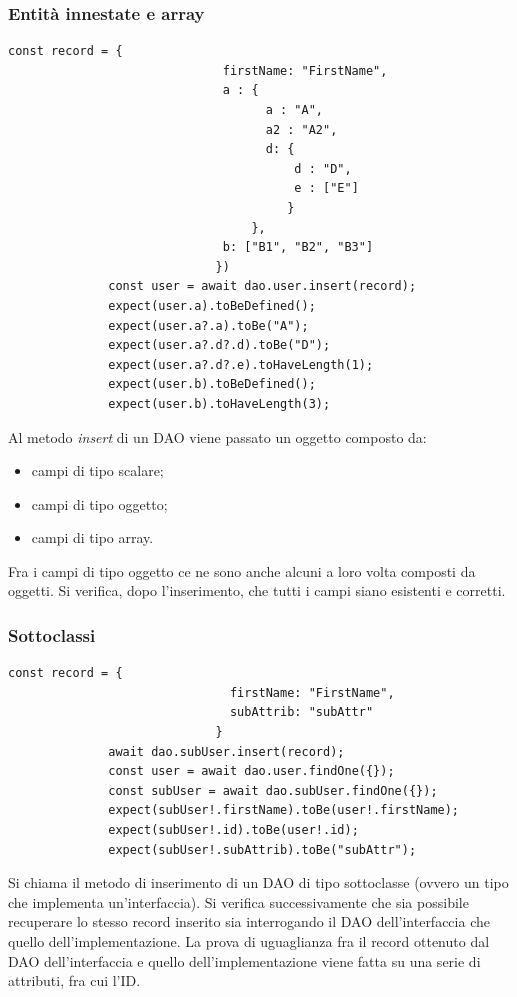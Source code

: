 \documentclass[a4paper, 12pt]{report}
\begin{document}
          \subsubsection{Entità innestate e array}
            \begin{Verbatim}[samepage=true]
              const record = {
                              firstName: "FirstName",
                              a : { 
                                    a : "A",
                                    a2 : "A2",
                                    d: { 
                                        d : "D",
                                        e : ["E"]
                                       }
                                  },
                              b: ["B1", "B2", "B3"]
                             })
              const user = await dao.user.insert(record);
              expect(user.a).toBeDefined();
              expect(user.a?.a).toBe("A");
              expect(user.a?.d?.d).toBe("D");
              expect(user.a?.d?.e).toHaveLength(1);
              expect(user.b).toBeDefined();
              expect(user.b).toHaveLength(3);
            \end{Verbatim}
            Al metodo \emph{insert} di un DAO viene passato un oggetto composto da:
            \begin{itemize}
              \item campi di tipo scalare;
              \item campi di tipo oggetto;
              \item campi di tipo array.
            \end{itemize}
            Fra i campi di tipo oggetto ce ne sono anche alcuni a loro volta composti da oggetti.
            Si verifica, dopo l'inserimento, che tutti i campi siano esistenti e corretti.
          \newpage
          \subsubsection{Sottoclassi}
            \begin{Verbatim}[samepage=true]
              const record = { 
                               firstName: "FirstName",
                               subAttrib: "subAttr"
                             }
              await dao.subUser.insert(record);
              const user = await dao.user.findOne({});
              const subUser = await dao.subUser.findOne({});
              expect(subUser!.firstName).toBe(user!.firstName);
              expect(subUser!.id).toBe(user!.id);
              expect(subUser!.subAttrib).toBe("subAttr");
            \end{Verbatim}
            Si chiama il metodo di inserimento di un DAO di tipo sottoclasse (ovvero un tipo che implementa un'interfaccia). Si verifica successivamente che sia possibile recuperare lo stesso record inserito sia interrogando il DAO dell'interfaccia che quello dell'implementazione. La prova di uguaglianza fra il record ottenuto dal DAO
            dell'interfaccia e quello dell'implementazione viene fatta su una serie di attributi, fra cui l'ID.
          \newpage
\end{document}
